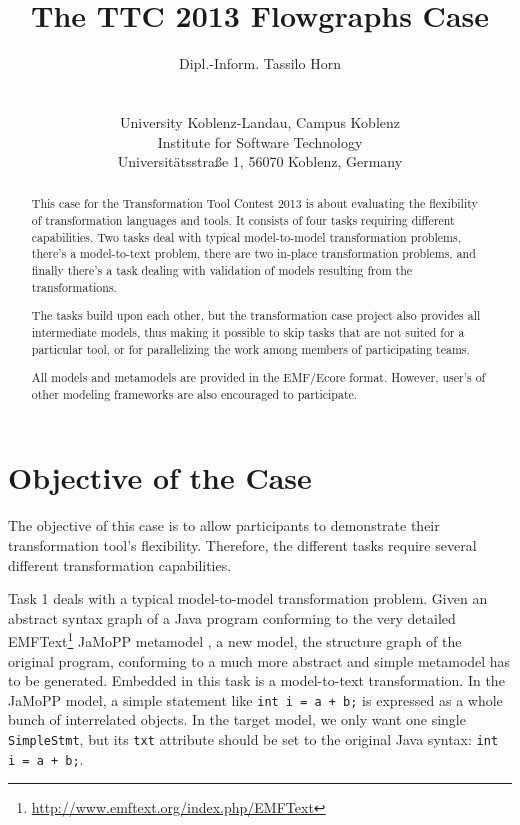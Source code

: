 \documentclass[11pt]{article}
\title{The TTC 2013 Flowgraphs Case}
\author{Dipl.-Inform. Tassilo Horn\\
  \myemail\\
  \vspace{0.3cm}\\
  University Koblenz-Landau, Campus Koblenz\\
  Institute for Software Technology\\
  Universitätsstraße 1, 56070 Koblenz, Germany}
\begin{document}
\maketitle

\begin{abstract}
  This case for the Transformation Tool Contest 2013 is about evaluating the
  flexibility of transformation languages and tools.  It consists of four tasks
  requiring different capabilities.  Two tasks deal with typical model-to-model
  transformation problems, there's a model-to-text problem, there are two
  in-place transformation problems, and finally there's a task dealing with
  validation of models resulting from the transformations.

  The tasks build upon each other, but the transformation case project also
  provides all intermediate models, thus making it possible to skip tasks that
  are not suited for a particular tool, or for parallelizing the work among
  members of participating teams.

  All models and metamodels are provided in the EMF/Ecore format.  However,
  user's of other modeling frameworks are also encouraged to participate.
\end{abstract}

\sloppy

\section{Objective of the Case}
\label{sec:objective}

The objective of this case is to allow participants to demonstrate their
transformation tool's flexibility.  Therefore, the different tasks require
several different transformation capabilities.

Task 1 deals with a typical model-to-model transformation problem.  Given an
abstract syntax graph of a Java program conforming to the very detailed
EMFText\footnote{\url{http://www.emftext.org/index.php/EMFText}} JaMoPP
metamodel \cite{jamopp09}, a new model, the structure graph of the original
program, conforming to a much more abstract and simple metamodel has to be
generated.  Embedded in this task is a model-to-text transformation.  In the
JaMoPP model, a simple statement like \verb|int i = a + b;| is expressed as a
whole bunch of interrelated objects.  In the target model, we only want one
single \verb|SimpleStmt|, but its \verb|txt| attribute should be set to the
original Java syntax: \verb|int i = a + b;|.
\end{document}
